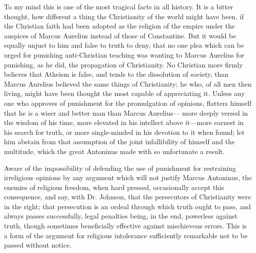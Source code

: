 \documentclass[11pt,openany]{book}
\begin{document}
To my mind this is one of the most tragical facts in all history. It is a bitter thought, how different a thing the Christianity of the world might have been, if the Christian faith had been adopted as the religion of the empire under the auspices of Marcus Aurelius instead of those of Constantine. But it would be equally unjust to him and false to truth to deny, that no one plea which can be urged for punishing anti-Christian teaching was wanting to Marcus Aurelius for punishing, as he did, the propagation of Christianity. No Christian more firmly believes that Atheism is false, and tends to the dissolution of society, than Marcus Aurelius believed the same things of Christianity; he who, of all men then living, might have been thought the most capable of appreciating it. Unless any one who approves of punishment for the promulgation of opinions, flatters himself that he is a wiser and better man than Marcus Aurelius--- more deeply versed in the wisdom of his time, more elevated in his intellect above it---more earnest in his search for truth, or more single-minded in his devotion to it when found; let him abstain from that assumption of the joint infallibility of himself and the multitude, which the great Antoninus made with so unfortunate a result.

Aware of the impossibility of defending the use of punishment for restraining irreligious opinions by any argument which will not justify Marcus Antoninus, the enemies of religious freedom, when hard pressed, occasionally accept this consequence, and say, with Dr. Johnson, that the persecutors of Christianity were in the right; that persecution is an ordeal through which truth ought to pass, and always passes successfully, legal penalties being, in the end, powerless against truth, though sometimes beneficially effective against mischievous errors. This is a form of the argument for religious intolerance sufficiently remarkable not to be passed without notice.
\end{document}
